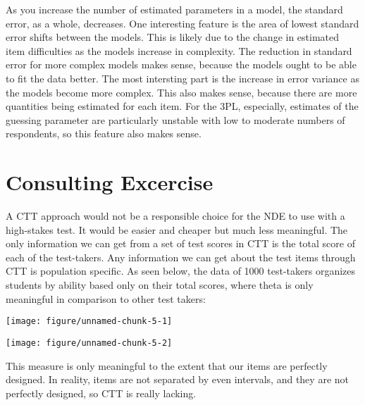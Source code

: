 \documentclass{article}\usepackage[]{graphicx}\usepackage[]{color}
\makeatletter
\newenvironment{kframe}{%
 \def\at@end@of@kframe{}%
 \ifinner\ifhmode%
  \def\at@end@of@kframe{\end{minipage}}%
  \begin{minipage}{\columnwidth}%
 \fi\fi%
 \def\FrameCommand##1{\hskip\@totalleftmargin \hskip-\fboxsep
 \colorbox{shadecolor}{##1}\hskip-\fboxsep
     \hskip-\linewidth \hskip-\@totalleftmargin \hskip\columnwidth}%
 \MakeFramed {\advance\hsize-\width
   \@totalleftmargin\z@ \linewidth\hsize
   \@setminipage}}%
 {\par\unskip\endMakeFramed%
 \at@end@of@kframe}
\newenvironment{knitrout}{}{} %
\makeatother
\begin{document}
\begin{enumerate}
\begin{knitrout}
\begin{kframe}
{\ttfamily\noindent\bfseries\color{errorcolor}{\#\# Error in jitter(thk3): object 'thk3' not found}}\end{kframe}
\end{knitrout}

As you increase the number of estimated parameters in a model, the standard error, as a whole, decreases.  One interesting feature is the area of lowest standard error shifts between the models.  This is likely due to the change in estimated item difficulties as the models increase in complexity.  The reduction in standard error for more complex models makes sense, because the models ought to be able to fit the data better.  The most intersting part is the increase in error variance as the models become more complex.  This also makes sense, because there are more quantities being estimated for each item.  For the 3PL, especially, estimates of the guessing parameter are particularly unstable with low to moderate numbers of respondents, so this feature also makes sense.

\section*{Consulting Excercise}

A CTT approach would not be a responsible choice for the NDE to use with a high-stakes test. It would be easier and cheaper but much less meaningful. The only information we can get from a set of test scores in CTT is the total score of each of the test-takers. Any information we can get about the test items through CTT is population specific. As seen below, the data of 1000 test-takers organizes students by ability based only on their total scores, where theta is only meaningful in comparison to other test takers:

\centering
\begin{knitrout}
\color{fgcolor}

{\centering \texttt{[image: figure/unnamed-chunk-5-1]} 

}




{\centering \texttt{[image: figure/unnamed-chunk-5-2]} 

}



\end{knitrout}
\raggedright
This measure is only meaningful to the extent that our items are perfectly designed. In reality, items are not separated by even intervals, and they are not perfectly designed, so CTT is really lacking. 


\end{enumerate}
\end{document}
